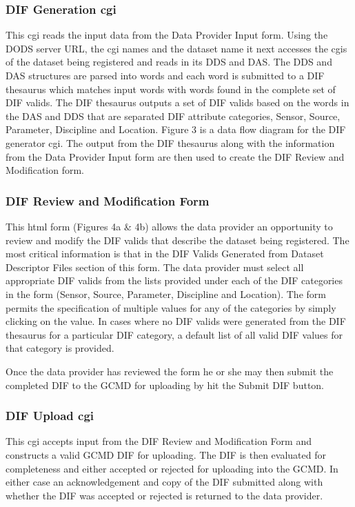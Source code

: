 \subsubsection{DIF Generation cgi}

This cgi reads the input data from the Data Provider Input form.  Using the
DODS server URL, the cgi names and the dataset name it next accesses the cgis
of the dataset being registered and reads in its DDS and DAS.  The DDS and
DAS structures are parsed into words and each word is submitted to a DIF
thesaurus which matches input words with words found in the complete set of
DIF valids.  The DIF thesaurus outputs a set of DIF valids based on the words
in the DAS and DDS that are separated DIF attribute categories, Sensor,
Source, Parameter, Discipline and Location. Figure 3 is a data flow diagram
for the DIF generator cgi.  The output from the DIF thesaurus
along with the information from the Data Provider Input form are then used
to create the DIF Review and Modification form.

\subsubsection{DIF Review and Modification Form}

This html form (Figures 4a \& 4b) allows the data provider an opportunity to
review and modify the DIF valids that describe the dataset being registered.
The most critical information is that in the DIF Valids Generated from
Dataset Descriptor Files section of this form.  The data provider must select
all appropriate DIF valids from the lists provided under each of the DIF
categories in the form (Sensor, Source, Parameter, Discipline and Location).
The form permits the specification of multiple values for any of the
categories by simply clicking on the value.  In cases where no DIF valids
were generated from the DIF thesaurus for a particular DIF category, a
default list of all valid DIF values for that category is provided.

Once the data provider has reviewed the form he or she may then submit the
completed DIF to the GCMD for uploading by hit the Submit DIF button. 

\subsubsection{DIF Upload cgi}

This cgi accepts input from the DIF Review and Modification Form and
constructs a valid GCMD DIF for uploading.   The DIF is then evaluated for
completeness and either accepted or rejected for uploading into the GCMD.  In
either case an acknowledgement and copy of the DIF submitted along with
whether the DIF was accepted or rejected is returned to the data provider.





